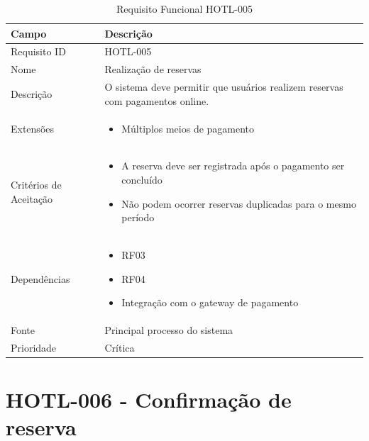 \documentclass[
    12pt,
    oneside,
    a4paper,
    brazil
]{abntex2}
\begin{document}
\begin{table}[h]
	\begin{tabular}{|l|p{10cm}|}
		\hline
		\textbf{Campo} & \textbf{Descrição} \\
		\hline
		Requisito ID & HOTL-005 \\
		\hline
		Nome & Realização de reservas\\
		\hline
		Descrição & O sistema deve permitir que usuários realizem reservas com pagamentos online. \\
		\hline
		Extensões & \begin{itemize}[leftmargin=*, labelsep=0.5em, noitemsep, topsep=0pt]
		\item Múltiplos meios de pagamento
		\end{itemize} \\
		\hline
		Critérios de Aceitação & \begin{itemize}[leftmargin=*, labelsep=0.5em, noitemsep, topsep=0pt]
		\item A reserva deve ser registrada após o pagamento ser concluído
		\item Não podem ocorrer reservas duplicadas para o mesmo período
		\end{itemize} \\
		\hline
		Dependências & \begin{itemize}[leftmargin=*, labelsep=0.5em, noitemsep, topsep=0pt] 
		\item RF03 
		\item RF04
		\item Integração com o gateway de pagamento
		\end{itemize} \\
		\hline
		Fonte & Principal processo do sistema \\
		\hline
		Prioridade & Crítica \\
		\hline
	\end{tabular}
	\caption{Requisito Funcional HOTL-005}
\end{table}

\section{HOTL-006 - Confirmação de reserva}
\end{document}
